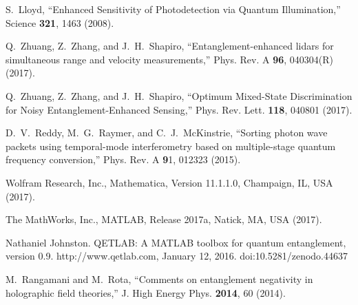 \documentclass[twocolumn,amssymb, nobibnotes, showpacs, aps, pra,10pt]{revtex4-1}
\begin{document}
\begin{thebibliography}{99}
 S.~Lloyd, ``Enhanced Sensitivity of Photodetection via Quantum Illumination,'' Science {\bf321}, 1463 (2008).

 Q.~Zhuang, Z.~Zhang, and J.~H.~Shapiro, ``Entanglement-enhanced lidars for simultaneous range and velocity measurements,'' Phys. Rev. A {\bf96}, 040304(R) (2017).

 Q.~Zhuang, Z.~Zhang, and J.~H.~Shapiro, ``Optimum Mixed-State Discrimination for Noisy Entanglement-Enhanced Sensing,'' Phys. Rev. Lett. {\bf118}, 040801 (2017).

 D.~V.~Reddy, M.~G.~Raymer, and C.~J.~McKinstrie, ``Sorting photon wave packets using temporal-mode interferometry based on multiple-stage quantum frequency conversion,'' Phys. Rev. A {\textbf 91}, 012323 (2015).

Wolfram Research, Inc., Mathematica, Version 11.1.1.0, Champaign, IL, USA (2017).

The MathWorks, Inc., MATLAB, Release 2017a, Natick, MA, USA (2017).

Nathaniel Johnston. QETLAB: A MATLAB toolbox for quantum entanglement, version 0.9. http://www.qetlab.com, January 12, 2016. doi:10.5281/zenodo.44637

 M.~Rangamani and M.~Rota, ``Comments on entanglement negativity in holographic field theories,'' J. High Energy Phys. {\bf2014}, 60 (2014).

\end{thebibliography}
\end{document}
